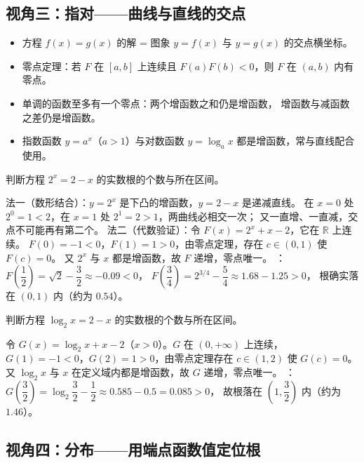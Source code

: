 \begin{explore}
\subsection{视角三：指对——曲线与直线的交点}

\begin{itemize}
  \item 方程 $f(x)=g(x)$ 的解 = 图象 $y=f(x)$ 与 $y=g(x)$ 的交点横坐标。
  \item 零点定理：若 $F$ 在 $[a,b]$ 上连续且 $F(a)F(b)<0$，则 $F$ 在 $(a,b)$ 内有零点。
  \item 单调的函数至多有一个零点：两个增函数之和仍是增函数，
        增函数与减函数之差仍是增函数。
  \item 指数函数 $y=a^x$（$a>1$）与对数函数 $y=\log_a x$ 都是增函数，常与直线配合使用。
\end{itemize}

\begin{example}
判断方程 $2^x=2-x$ 的实数根的个数与所在区间。
\end{example}
\begin{solution}
法一（数形结合）：$y=2^x$ 是下凸的增函数，$y=2-x$ 是递减直线。
在 $x=0$ 处 $2^0=1<2$，在 $x=1$ 处 $2^1=2>1$，两曲线必相交一次；
又一直增、一直减，交点不可能再有第二个。
法二（代数验证）：令 $F(x)=2^x+x-2$，它在 $\mathbb{R}$ 上连续。
$F(0)=-1<0$，$F(1)=1>0$，由零点定理，存在 $c\in(0,1)$ 使 $F(c)=0$。
又 $2^x$ 与 $x$ 都是增函数，故 $F$ 递增，零点唯一。
：$F\left(\dfrac12\right)=\sqrt2-\dfrac32\approx-0.09<0$，
$F\left(\dfrac34\right)=2^{3/4}-\dfrac54\approx1.68-1.25>0$，
根确实落在 $(0,1)$ 内（约为 $0.54$）\checkmark。
\end{solution}

\begin{problem}
判断方程 $\log_2 x=2-x$ 的实数根的个数与所在区间。
\end{problem}
\begin{solution}
令 $G(x)=\log_2x+x-2$（$x>0$）。$G$ 在 $(0,+\infty)$ 上连续，
$G(1)=-1<0$，$G(2)=1>0$，由零点定理存在 $c\in(1,2)$ 使 $G(c)=0$。
又 $\log_2x$ 与 $x$ 在定义域内都是增函数，故 $G$ 递增，零点唯一。
：$G\left(\dfrac32\right)=\log_2\dfrac32-\dfrac12\approx0.585-0.5=0.085>0$，
故根落在 $\left(1,\dfrac32\right)$ 内（约为 $1.46$）\checkmark。
\end{solution}

\subsection{视角四：分布——用端点函数值定位根}


\end{explore}
